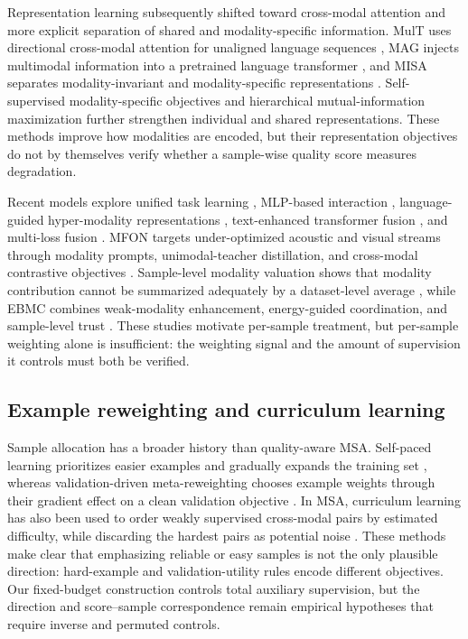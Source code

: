 Representation learning subsequently shifted toward cross-modal
attention and more explicit separation of shared and modality-specific
information. MulT uses directional cross-modal attention for unaligned
language sequences \cite{tsai2019multimodal}, MAG injects multimodal
information into a pretrained language transformer
\cite{rahman2020integrating}, and MISA separates modality-invariant and
modality-specific representations \cite{hazarika2020misa}.
Self-supervised modality-specific objectives \cite{yu2021learning} and
hierarchical mutual-information maximization \cite{han2021improving}
further strengthen individual and shared representations. These methods
improve how modalities are encoded, but their representation objectives
do not by themselves verify whether a sample-wise quality score measures
degradation.

Recent models explore unified task learning \cite{hu2022unimse},
MLP-based interaction \cite{sun2022cubemlp}, language-guided
hyper-modality representations \cite{zhang2023learning}, text-enhanced
transformer fusion \cite{wang2023tetfn}, and multi-loss fusion
\cite{wu2024multimodal}. MFON targets under-optimized acoustic and
visual streams through modality prompts, unimodal-teacher distillation,
and cross-modal contrastive objectives \cite{zhang2025mfon}.
Sample-level modality valuation shows that modality contribution cannot
be summarized adequately by a dataset-level average \cite{wei2024smv},
while EBMC combines weak-modality enhancement, energy-guided
coordination, and sample-level trust \cite{he2026ebmc}. These studies
motivate per-sample treatment, but per-sample weighting alone is
insufficient: the weighting signal and the amount of supervision it
controls must both be verified.

\subsection{Example reweighting and curriculum
learning}\label{example-reweighting-and-curriculum-learning}

Sample allocation has a broader history than quality-aware MSA. Self-paced
learning prioritizes easier examples and gradually expands the training set
\cite{kumar2010selfpaced}, whereas validation-driven meta-reweighting chooses
example weights through their gradient effect on a clean validation objective
\cite{ren2018reweight}. In MSA, curriculum learning has also been used to order
weakly supervised cross-modal pairs by estimated difficulty, while discarding
the hardest pairs as potential noise \cite{mai2022curriculum}. These methods
make clear that emphasizing reliable or easy samples is not the only plausible
direction: hard-example and validation-utility rules encode different
objectives. Our fixed-budget construction controls total auxiliary supervision,
but the direction and score--sample correspondence remain empirical hypotheses
that require inverse and permuted controls.

